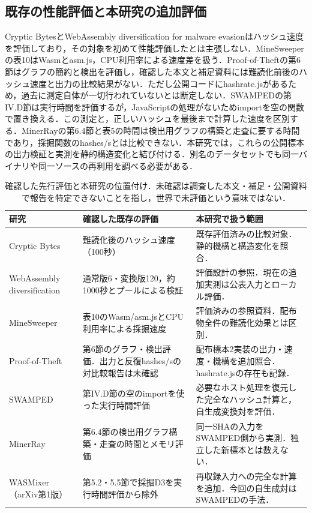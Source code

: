 \documentclass[submit,techrep]{ipsj}
\begin{document}
\subsection{既存の性能評価と本研究の追加評価}
Cryptic BytesとWebAssembly diversification for malware evasionはハッシュ速度を評価しており，その対象を初めて性能評価したとは主張しない\cite{harnes2024,cabrera2023}．MineSweeperの表10はWasmとasm.js，CPU利用率による速度差を扱う\cite{konoth2018}．Proof-of-Theftの第6節はグラフの簡約と検出を評価し，確認した本文と補足資料には難読化前後のハッシュ速度と出力の比較結果がない\cite{sermchaiwong2026}．ただし公開コードにhashrate.jsがあるため，過去に測定自体が一切行われていないとは断定しない．SWAMPEDの第IV.D節は実行時間を評価するが，JavaScriptの処理がないためimportを空の関数で置き換える\cite{kim2025}．この測定と，正しいハッシュを最後まで計算した速度を区別する．MinerRayの第6.4節と表5の時間は検出用グラフの構築と走査に要する時間であり，採掘関数のhashes/sとは比較できない\cite{romano2020minerray}．本研究では，これらの公開標本の出力検証と実測を静的構造変化と結び付ける．別名のデータセットでも同一バイナリや同一ソースの再利用を調べる必要がある．


\begin{table}[t]
\centering\small
\caption{確認した先行評価と本研究の位置付け．未確認は調査した本文・補足・公開資料で報告を特定できないことを指し，世界で未評価という意味ではない．}
\label{tab:prior-performance}
\begin{tabular}{p{}p{}p{}}
\hline
研究 & 確認した既存の評価 & 本研究で扱う範囲 \\
\hline
Cryptic Bytes\cite{harnes2024} & 難読化後のハッシュ速度（100秒） & 既存評価済みの比較対象．静的機構と構造変化を照合．\\
WebAssembly diversification\cite{cabrera2023} & 通常版6・変換版120，約1000秒とプールによる検証 & 評価設計の参照．現在の追加実測は公表入力とローカル評価．\\
MineSweeper\cite{konoth2018} & 表10のWasm/asm.jsとCPU利用率による採掘速度 & 評価済みの参照資料．配布物全件の難読化効果とは区別．\\
Proof-of-Theft\cite{sermchaiwong2026} & 第6節のグラフ・検出評価．出力と反復hashes/sの対比較報告は未確認 & 配布標本2実装の出力・速度・機構を追加照合．hashrate.jsの存在も記録．\\
SWAMPED\cite{kim2025} & 第IV.D節の空のimportを使った実行時間評価 & 必要なホスト処理を復元した完全なハッシュ計算と，自生成変換対を評価．\\
MinerRay\cite{romano2020minerray} & 第6.4節の検出用グラフ構築・走査の時間とメモリ評価 & 同一SHAの入力をSWAMPED側から実測．独立した新標本とは数えない．\\
WASMixer（arXiv第1版）\cite{cao2023} & 第5.2・5.5節で採掘D3を実行時間評価から除外 & 再収録入力への完全な計算を追加．今回の自生成対はSWAMPEDの手法．\\
\hline
\end{tabular}
\end{table}
\end{document}
